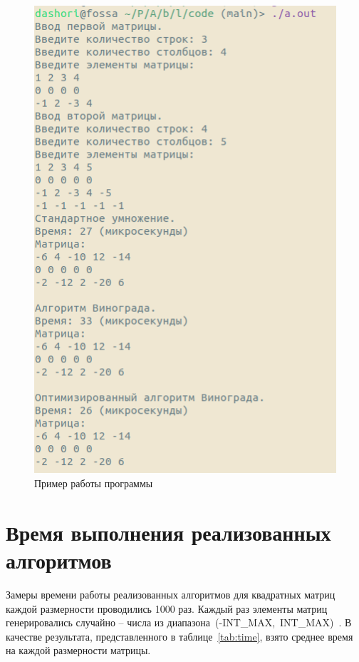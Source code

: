 \begin{figure}[h]
	\centering
	\includegraphics[width=130mm]{images/example}
	\caption{Пример работы программы}
	\label{img:example}
\end{figure}

\clearpage
\section{Время выполнения реализованных алгоритмов}
Замеры времени работы реализованных алгоритмов для квадратных матриц каждой размерности проводились 1000 раз. Каждый раз элементы матриц генерировались случайно -- числа из диапазона~(-INT\_MAX,~INT\_MAX)~\cite{si}. В качестве результата, представленного в таблице~\ref{tab:time}, взято среднее время на каждой размерности матрицы.

